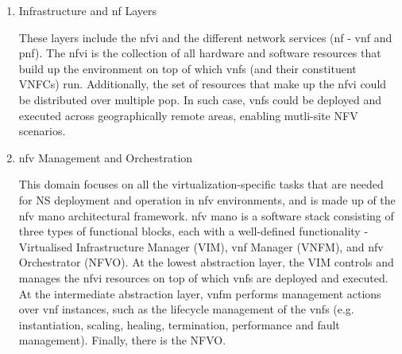         \begin{enumerate}

        \item Infrastructure and \acrshort{nf} Layers
        
        These layers include the \acrfull{nfvi} and the different network services (\acrshort{nf} - \acrshort{vnf} and \acrshort{pnf}). The \acrshort{nfvi} is the collection of all hardware and software resources that build up the environment on top of which \acrshort{vnf}s (and their constituent VNFCs) run. Additionally, the set of resources that make up the \acrshort{nfvi} could be distributed over multiple \acrfull{pop}. In such case, \acrshort{vnf}s could be deployed and executed across geographically remote areas, enabling mutli-site NFV scenarios.
        
        \item \acrshort{nfv} Management and Orchestration
        
        This domain focuses on all the virtualization-specific tasks that are needed for NS deployment and operation in \acrshort{nfv} environments, and is made up of the \acrshort{nfv} \acrfull{mano} architectural framework. \acrshort{nfv} \acrshort{mano} is a software stack consisting of three types of functional blocks, each with a well-defined functionality - Virtualised Infrastructure Manager (VIM), \acrshort{vnf} Manager (VNFM), and \acrshort{nfv} Orchestrator (NFVO). At the lowest abstraction layer, the VIM controls and manages the \acrshort{nfvi} resources on top of which \acrshort{vnf}s are deployed and executed. At the intermediate abstraction layer, \acrshort{vnfm} performs management actions over \acrshort{vnf} instances, such as the lifecycle management of the \acrshort{vnf}s (e.g. instantiation, scaling, healing, termination, performance and fault management). Finally, there is the NFVO.
        
        
            

\end{enumerate}
